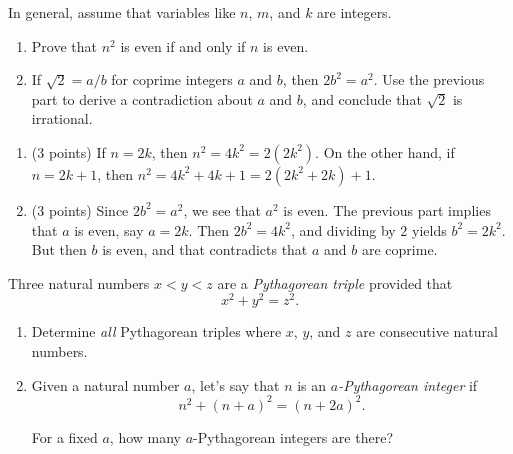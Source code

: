 \documentclass[12pt]{rudin}
\begin{document}
In general, assume that variables like $n$, $m$, and $k$ are integers.

\begin{Exercise}
    \begin{enumerate}[label=(\textbf{\alph*})]
        \item Prove that $n^2$ is even if and only if $n$ is even.

        \item If $\sqrt{2} = a / b$ for coprime integers $a$ and $b$, then $2
            b^2 = a^2$. Use the previous part to derive a contradiction about
            $a$ and $b$, and conclude that $\sqrt{2}$ is irrational.
    \end{enumerate}
\end{Exercise}

\begin{Answer}
    \begin{enumerate}[label=(\textbf{\alph*})]
	    \item (3 points) If $n = 2k$, then $n^2 = 4k^2 = 2(2k^2)$. On the other hand,
		    if $n = 2k + 1$, then $n^2 = 4k^2 + 4k + 1 = 2(2k^2 + 2k) +
		    1$.

	    \item (3 points) Since $2b^2 = a^2$, we see that $a^2$ is even. The previous part
		implies that $a$ is even, say $a = 2k$. Then $2b^2 = 4k^2$, and
		    dividing by $2$ yields $b^2 = 2k^2$. But then $b$ is even,
		    and that contradicts that $a$ and $b$ are coprime.
    \end{enumerate}
\end{Answer}

\begin{Exercise}
    Three natural numbers $x < y < z$ are a \emph{Pythagorean triple} provided that
    \begin{equation*}
        x^2 + y^2 = z^2.
    \end{equation*}
    \begin{enumerate}[label=(\textbf{\alph*})]
	    \item Determine \emph{all} Pythagorean triples where $x$, $y$, and $z$
            are consecutive natural numbers.

        \item Given a natural number $a$, let's say that $n$ is an
            \emph{$a$-Pythagorean integer} if
            \begin{equation*}
                n^2 + (n + a)^2 = (n + 2a)^2.
            \end{equation*}

            For a fixed $a$, how many $a$-Pythagorean integers are there?
    \end{enumerate}
\end{Exercise}
\end{document}
